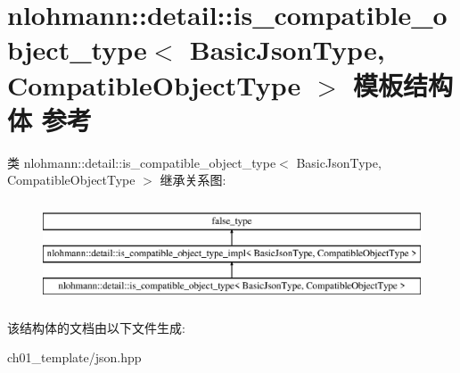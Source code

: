 \hypertarget{structnlohmann_1_1detail_1_1is__compatible__object__type}{}\section{nlohmann\+::detail\+::is\+\_\+compatible\+\_\+object\+\_\+type$<$ Basic\+Json\+Type, Compatible\+Object\+Type $>$ 模板结构体 参考}
\label{structnlohmann_1_1detail_1_1is__compatible__object__type}
类 nlohmann\+::detail\+::is\+\_\+compatible\+\_\+object\+\_\+type$<$ Basic\+Json\+Type, Compatible\+Object\+Type $>$ 继承关系图\+:\begin{figure}[H]
\begin{center}
\leavevmode
\includegraphics[height=3.000000cm]{structnlohmann_1_1detail_1_1is__compatible__object__type}
\end{center}
\end{figure}


该结构体的文档由以下文件生成\+:\begin{DoxyCompactItemize}
\item 
ch01\+\_\+template/json.\+hpp\end{DoxyCompactItemize}
